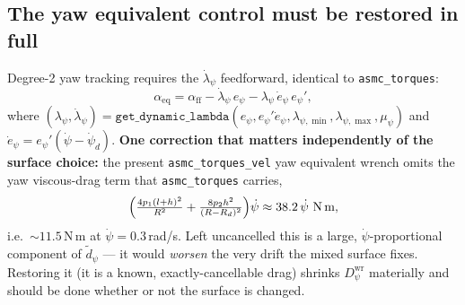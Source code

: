\documentclass[11pt]{article}
\theoremstyle{plain}
\theoremstyle{definition}
\newcommand{\Dwr}{D^{\mathrm{wr}}}
\begin{document}
\subsection{The yaw equivalent control must be restored in full}
\label{sec:mixed_eq}
Degree-2 yaw tracking requires the $\dot\lambda_\psi$ feedforward, identical to
\texttt{asmc\_torques}:
\begin{equation}
\alpha_{\mathrm{eq}}=\alpha_{\mathrm{ff}}
-\dot\lambda_\psi\,e_\psi-\lambda_\psi\,\dot e_\psi\,e_\psi',
\label{eq:mixed_alpha}
\end{equation}
where $(\lambda_\psi,\dot\lambda_\psi)=\texttt{get\_dynamic\_lambda}(e_\psi,
e_\psi'\dot e_\psi,\lambda_{\psi,\min},\lambda_{\psi,\max},\mu_\psi)$ and
$\dot e_\psi=e_\psi'(\dot\psi-\dot\psi_d)$. \textbf{One correction that matters
independently of the surface choice:} the present \texttt{asmc\_torques\_vel} yaw
equivalent wrench omits the yaw viscous-drag term that \texttt{asmc\_torques} carries,
\begin{equation}
\Big(\tfrac{4p_1(l+h)^2}{R^2}+\tfrac{8p_2h^2}{(R-R_d)^2}\Big)\dot\psi
\approx 38.2\,\dot\psi\ \text{N\,m},
\label{eq:yaw_visc}
\end{equation}
i.e.\ ${\sim}11.5\,$N\,m at $\dot\psi=0.3\,$rad/s. Left uncancelled this is a large,
$\dot\psi$-proportional component of $\tilde d_\psi$ --- it would \emph{worsen} the very
drift the mixed surface fixes. Restoring it (it is a known, exactly-cancellable drag)
shrinks $\Dwr_\psi$ materially and should be done whether or not the surface is changed.
\end{document}
